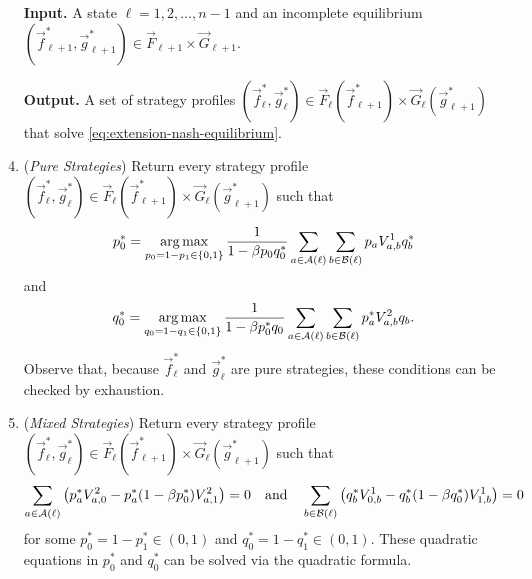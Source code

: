     \begin{algorithm}  \label{alg:extension-algorithm}
    \begin{enumerate}[
        leftmargin=*,
        align=left,
        label=\textbf{Step \arabic*.}
    ]
        \item[]
    
        \item[\textbf{Input.}]
        A state $\ell = 1, 2, \ldots, n - 1$ and an incomplete equilibrium $(\vec{f}^*_{\ell + 1}, \vec{g}^*_{\ell + 1}) \in \vec{F}_{\ell + 1} \times \vec{G}_{\ell + 1}$.
        
        \item[\textbf{Output.}]
        A set of strategy profiles $(\vec{f}^*_\ell, \vec{g}^*_\ell) \in \vec{F}_\ell(\vec{f}^*_{\ell + 1}) \times \vec{G}_\ell(\vec{g}^*_{\ell + 1})$ that solve \eqref{eq:extension-nash-equilibrium}.

        \item (\textit{Pure Strategies})
        Return every strategy profile $(\vec{f}^*_\ell, \vec{g}^*_\ell) \in \vec{F}_\ell(\vec{f}^*_{\ell + 1}) \times \vec{G}_\ell(\vec{g}^*_{\ell + 1})$ such that
        \begin{equation}  \label{eq:pure-strategy-extension-condition-1}
            p^*_0
                = \operatorname*{arg\,max}_{p_0 = 1 - p_1 \in \{0, 1\}} \frac{1}{1 - \beta p_0 q^*_0} \sum_{a \in \mathcal{A}(\ell)} \sum_{b \in \mathcal{B}(\ell)} p_a V^1_{a, b} q^*_b
        \end{equation}
        and
        \begin{equation} \label{eq:pure-strategy-extension-condition-2}
            q^*_0
                = \operatorname*{arg\,max}_{q_0 = 1 - q_1 \in \{0, 1\}} \frac{1}{1 - \beta p^*_0 q_0} \sum_{a \in \mathcal{A}(\ell)} \sum_{b \in \mathcal{B}(\ell)} p^*_a V^2_{a, b} q_b.
        \end{equation}
        Observe that, because $\vec{f}^*_\ell$ and $\vec{g}^*_\ell$ are pure strategies, these conditions can be checked by exhaustion.

        \item (\textit{Mixed Strategies})
        Return every strategy profile $(\vec{f}^*_\ell, \vec{g}^*_\ell) \in \vec{F}_\ell(\vec{f}^*_{\ell + 1}) \times \vec{G}_\ell(\vec{g}^*_{\ell + 1})$ such that
        \begin{equation} \label{eq:mixed-strategy-extension-condition}
            \sum_{a \in \mathcal{A}(\ell)} \big( p^*_a V_{a, 0}^2 - p^*_a (1 - \beta p^*_0) V_{a, 1}^2 \big) = 0
            \quad\text{and}\quad
            \sum_{b \in \mathcal{B}(\ell)}  \big( q^*_b V^1_{0, b} - q^*_b (1 - \beta q^*_0) V^1_{1, b} \big) = 0
        \end{equation}
        for some $p^*_0 = 1 - p^*_1 \in (0, 1)$ and $q^*_0 = 1 - q^*_1 \in (0, 1)$.
        These quadratic equations in $p^*_0$ and $q^*_0$ can be solved via the quadratic formula.
    \end{enumerate}
    \end{algorithm}

